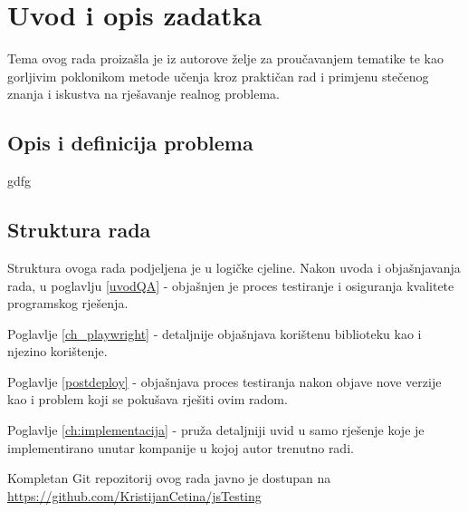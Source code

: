 \chapter{Uvod i opis zadatka}\label{OpisIOgranicenja}
Tema ovog rada proizašla je iz autorove želje za proučavanjem tematike te kao gorljivim poklonikom metode učenja kroz praktičan rad i primjenu stečenog znanja i iskustva na rješavanje realnog problema.


\section{Opis i definicija problema}
gdfg


\section{Struktura rada}
Struktura ovoga rada podjeljena je u logičke cjeline.
Nakon uvoda i objašnjavanja rada, u poglavlju \ref{uvodQA} -  objašnjen je proces testiranje i osiguranja kvalitete programskog rješenja.

Poglavlje \ref{ch_playwright} -  detaljnije objašnjava korištenu biblioteku kao i njezino korištenje.

Poglavlje \ref{postdeploy} -  objašnjava proces testiranja nakon objave nove verzije kao i problem koji se pokušava rješiti ovim radom.

Poglavlje \ref{ch:implementacija} -  pruža detaljniji uvid u samo rješenje koje je implementirano unutar kompanije u kojoj autor trenutno radi.

Kompletan Git repozitorij ovog rada javno je dostupan na \url{https://github.com/KristijanCetina/jsTesting}